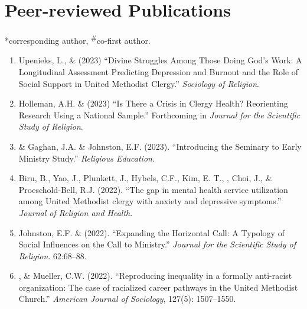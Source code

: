 \newcommand{\Revision}{\textit{under revision}}
\newcommand{\CS}{*} %
\newcommand{\CF}{\textsuperscript{\#}} %

\section*{Peer-reviewed Publications}
\CS corresponding author, \CF co-first author.

\begin{enumerate}
\item Upenieks, L., \& \Eagle\hspace{0.1em} (2023) ``Divine Struggles Among Those Doing God’s Work: A Longitudinal Assessment Predicting Depression and Burnout and the Role of Social Support in United Methodist Clergy.'' \textit{Sociology of Religion}.  
	
\item Holleman, A.H. \& \Eagle\hspace{.01em} (2023) ``Is There a Crisis in Clergy Health? Reorienting Research Using a National Sample.'' Forthcoming in  \textit{Journal for the Scientific Study of Religion}.

\item \Eagle \hspace{.01em} \& Gaghan, J.A. \& Johnston, E.F. (2023). ``Introducing the Seminary to Early Ministry Study.''  \textit{Religious Education}. 
	
\item Biru, B., Yao, J., Plunkett, J., Hybels, C.F., Kim, E. T., \Eagle, Choi, J., \& Proeschold-Bell, R.J. (2022). ``The gap in mental health service utilization among United Methodist clergy with anxiety and depressive symptoms.'' \textit{Journal of Religion and Health}. 
	
\item Johnston, E.F. \& \Eagle  \hspace{.1em} (2022). ``Expanding the Horizontal Call: A Typology of Social Influences on the Call to Ministry.'' \textit{Journal for the Scientific Study of Religion}. 62:68--88.  

\item \Eagle, \& Mueller, C.W. \hspace{.1em} (2022). ``Reproducing inequality in a formally anti-racist organization: The case of racialized career pathways in the United Methodist Church.'' \textit{American Journal of Sociology}, 127(5): 1507–1550. 


\end{enumerate}
